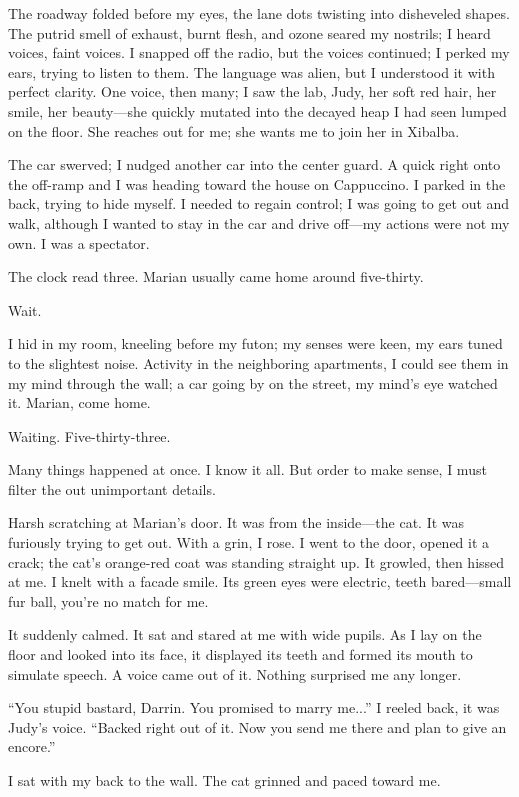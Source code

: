 \documentclass[
]{article}
\begin{document}
The roadway folded before my eyes, the lane dots twisting into
disheveled shapes. The putrid smell of exhaust, burnt flesh, and ozone
seared my nostrils; I heard voices, faint voices. I snapped off the
radio, but the voices continued; I perked my ears, trying to listen to
them. The language was alien, but I understood it with perfect clarity.
One voice, then many; I saw the lab, Judy, her soft red hair, her smile,
her beauty---she quickly mutated into the decayed heap I had seen lumped
on the floor. She reaches out for me; she wants me to join her in
Xibalba.

The car swerved; I nudged another car into the center guard. A quick
right onto the off-ramp and I was heading toward the house on
Cappuccino. I parked in the back, trying to hide myself. I needed to
regain control; I was going to get out and walk, although I wanted to
stay in the car and drive off---my actions were not my own. I was a
spectator.

The clock read three. Marian usually came home around five-thirty.

Wait.

I hid in my room, kneeling before my futon; my senses were keen, my ears
tuned to the slightest noise. Activity in the neighboring apartments, I
could see them in my mind through the wall; a car going by on the
street, my mind's eye watched it. Marian, come home.

Waiting. Five-thirty-three.

Many things happened at once. I know it all. But order to make sense, I
must filter the out unimportant details.

Harsh scratching at Marian's door. It was from the inside---the cat. It
was furiously trying to get out. With a grin, I rose. I went to the
door, opened it a crack; the cat's orange-red coat was standing straight
up. It growled, then hissed at me. I knelt with a facade smile. Its
green eyes were electric, teeth bared---small fur ball, you're no match
for me.

It suddenly calmed. It sat and stared at me with wide pupils. As I lay
on the floor and looked into its face, it displayed its teeth and formed
its mouth to simulate speech. A voice came out of it. Nothing surprised
me any longer.

``You stupid bastard, Darrin. You promised to marry me...'' I reeled
back, it was Judy's voice. ``Backed right out of it. Now you send me
there and plan to give an encore.''

I sat with my back to the wall. The cat grinned and paced toward me.
\end{document}
